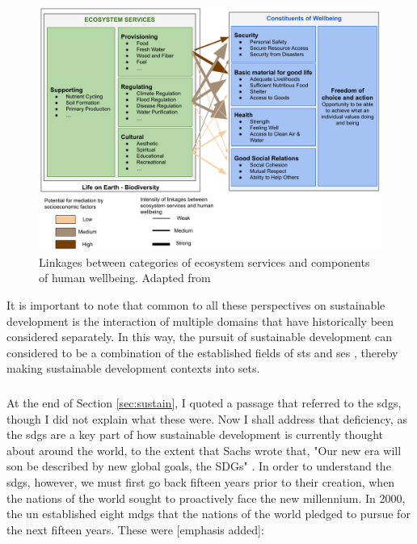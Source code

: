 \begin{figure}[h]
	\centering
	\includegraphics[scale=0.35]{Figures/chap2/services_wellbeing.png}
	\caption[Linkages between categories of ecosystem services and components of human wellbeing]{Linkages between categories of ecosystem services and components of human wellbeing. Adapted from \cite{reidEcosystemsHumanWellbeing2005}}
	\label{fig:services_wellbeing}
\end{figure}

It is important to note that common to all these perspectives on sustainable development is the interaction of multiple domains that have historically been considered separately. In this way, the pursuit of sustainable development can considered to be a combination of the established fields of \acf{sts} \cite{rouseUnderstandingChangeComplex2012,siddiqiSociotechnicalSystemsSustainability2017,sussmanTeachingComplexSociotechnical2010} and \acf{ses} \cite{elsawahEightGrandChallenges2020}, thereby making sustainable development contexts into \acf{sets}.

\subsubsection{}

At the end of Section \ref{sec:sustain}, I quoted a passage that referred to the \acp{sdg}, though I did not explain what these were. Now I shall address that deficiency, as the \acp{sdg} are a key part of how sustainable development is currently thought about around the world, to the extent that Sachs wrote that, "Our new era will son be described by new global goals, the SDGs" \cite{sachsAgeSustainableDevelopment2015}. In order to understand the \acp{sdg}, however, we must first go back fifteen years prior to their creation, when the nations of the world sought to proactively face the new millennium. In 2000, the \ac{un} established eight \acp{mdg} that the nations of the world pledged to pursue for the next fifteen years. These were [emphasis added]:

